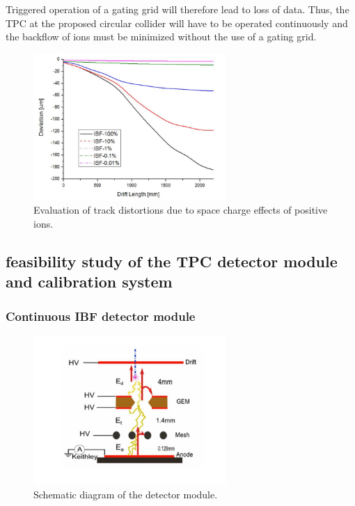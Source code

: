 Triggered operation of a gating grid will therefore lead to loss of data. Thus, the TPC at the proposed circular collider will have to be operated continuously and the backflow of ions must be minimized without the use of a gating grid.

\begin{figure}[htbp]
\centering
\includegraphics[width=0.65\textwidth]{figures/TrackingSystem/TPC_distortion.jpg}
\caption{\label{fig:TPC_distortion} Evaluation of track distortions due to space charge effects of positive ions.}
\end{figure}



\subsection{feasibility study of the TPC detector module and calibration system}
\subsubsection{Continuous IBF detector module}

\begin{figure}[htbp]
\centering
\includegraphics[width=0.65\textwidth]{figures/TrackingSystem/TPC_IBF_det.jpg}
\caption{\label{fig:TPC_IBF_det} Schematic diagram of the detector module.}
\end{figure}

